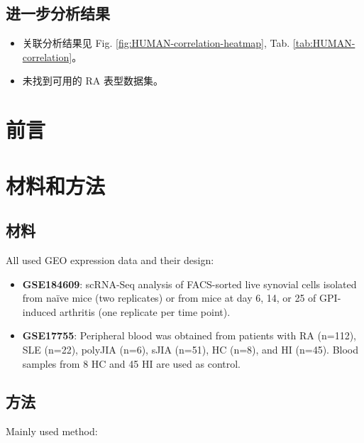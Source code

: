 \documentclass[
]{article}
\providecommand{\tightlist}{%
  \setlength{\itemsep}{0pt}\setlength{\parskip}{0pt}}
\begin{document}
\hypertarget{ux8fdbux4e00ux6b65ux5206ux6790ux7ed3ux679c}{%
\subsection{进一步分析结果}\label{ux8fdbux4e00ux6b65ux5206ux6790ux7ed3ux679c}}

\begin{itemize}
\tightlist
\item
  关联分析结果见 Fig. \ref{fig:HUMAN-correlation-heatmap}, Tab. \ref{tab:HUMAN-correlation}。
\item
  未找到可用的 RA 表型数据集。
\end{itemize}

\hypertarget{introduction}{%
\section{前言}\label{introduction}}

\hypertarget{methods}{%
\section{材料和方法}\label{methods}}

\hypertarget{ux6750ux6599}{%
\subsection{材料}\label{ux6750ux6599}}

All used GEO expression data and their design:

\begin{itemize}
\item
  \textbf{GSE184609}: scRNA-Seq analysis of FACS-sorted live synovial cells isolated from naïve mice (two replicates) or from mice at day 6, 14, or 25 of GPI-induced arthritis (one replicate per time point).
\item
  \textbf{GSE17755}: Peripheral blood was obtained from patients with RA (n=112), SLE (n=22), polyJIA (n=6), sJIA (n=51), HC (n=8), and HI (n=45). Blood samples from 8 HC and 45 HI are used as control.
\end{itemize}

\hypertarget{ux65b9ux6cd5}{%
\subsection{方法}\label{ux65b9ux6cd5}}

Mainly used method:
\end{document}
